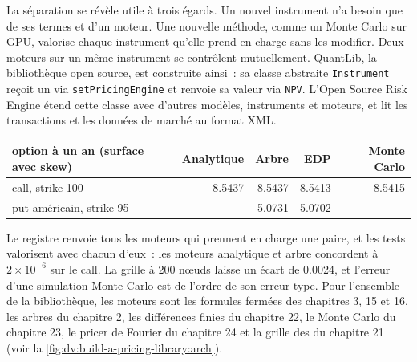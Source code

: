 La séparation se révèle utile à trois égards. Un nouvel instrument n'a besoin que de ses termes et d'un moteur. Une nouvelle méthode, comme un Monte Carlo sur GPU, valorise chaque instrument
qu'elle prend en charge sans les modifier. Deux moteurs sur un même instrument se contrôlent mutuellement. QuantLib, la bibliothèque open source, est construite ainsi~: sa
classe abstraite \texttt{Instrument} reçoit un  via \texttt{setPricingEngine} et renvoie sa valeur via \texttt{NPV}. L'Open Source
Risk Engine étend cette classe avec d'autres modèles, instruments et moteurs, et lit les transactions et les données de marché au format XML.

\begin{center}\small
\begin{tabular}{lrrrr}
\toprule
option à un an (surface avec skew) & Analytique & Arbre & EDP & Monte Carlo\\
\midrule
call, strike 100 & 8.5437 & 8.5437 & 8.5413 & 8.5415\\
put américain, strike 95 & --- & 5.0731 & 5.0702 & ---\\
\bottomrule
\end{tabular}
\end{center}

Le registre renvoie tous les moteurs qui prennent en charge une paire, et les tests valorisent avec chacun d'eux~: les moteurs analytique et arbre concordent à $2\times10^{-6}$ sur le
call. La grille à 200 nœuds laisse un écart de 0.0024, et l'erreur d'une simulation Monte Carlo est de l'ordre de son erreur type. Pour l'ensemble de la bibliothèque, les moteurs sont les
formules fermées des chapitres 3, 15 et 16, les arbres du chapitre 2, les différences finies du chapitre 22, le Monte Carlo du chapitre 23, le pricer de Fourier du
chapitre 24 et la grille des  du chapitre 21 (voir la \cref{fig:dv:build-a-pricing-library:arch}).

